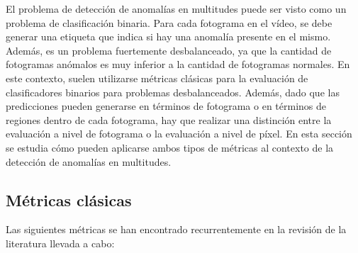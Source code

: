 \documentclass[../main.tex]{memoir}
\begin{document}
El problema de detección de anomalías en multitudes puede ser visto
como un problema de clasificación binaria. Para cada fotograma en el
vídeo, se debe generar una etiqueta que indica si hay una anomalía
presente en el mismo. Además, es un problema fuertemente
desbalanceado, ya que la cantidad de fotogramas anómalos es muy
inferior a la cantidad de fotogramas normales. En este contexto,
suelen utilizarse métricas clásicas para la evaluación de
clasificadores binarios para problemas desbalanceados. Además, dado
que las predicciones pueden generarse en términos de fotograma o en
términos de regiones dentro de cada fotograma, hay que realizar una
distinción entre la evaluación a nivel de fotograma o la evaluación a
nivel de píxel. En esta sección se estudia cómo pueden aplicarse
ambos tipos de métricas al contexto de la detección de anomalías
en multitudes.

\subsection{Métricas clásicas}

Las siguientes métricas se han encontrado recurrentemente en la
revisión de la literatura llevada a cabo:
\end{document}
